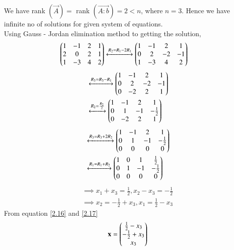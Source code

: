 \documentclass[journal,12pt,twocolumn]{IEEEtran}
\begin{document}
We have rank $\left( \vec{A} \right) = $  rank $\left( \vec{A:b}\right) = 2 < n $, where $n = 3. $ Hence we have infinite no of solutions for given system of equations.\\
Using Gauss - Jordan elimination method to getting the solution,
\begin{align}
\begin{pmatrix}1&-1& 2 & 1 \\ 2& 0 & 2 & 1 \\ 1 & -3 & 4 & 2 \end{pmatrix} &\xleftrightarrow{R_2=R_1 - 2R_1}\begin{pmatrix}1&-1&2 & 1  \\ 0 &2 & -2 & -1 \\ 1 &-3 & 4 & 2\end{pmatrix}
\end{align}
\begin{align}
&\xleftrightarrow{R_3=R_3 -R_1}\begin{pmatrix}1 &-1&2 & 1\\0 &2 &-2 &-1 \\ 0 & -2 & 2 & 1\end{pmatrix} \\
&\xleftrightarrow{R_2= \frac{R_2}{2}}\begin{pmatrix}1 &-1&2 & 1 \\ 0 & 1 & -1 & -\frac{1}{2} \\ 0 & -2 & 2 & 1\end{pmatrix} 
\end{align}
\begin{align}
&\xleftrightarrow{R_3 = R_3 +2R_2}\begin{pmatrix}1 &-1&2 & 1 \\ 0 & 1 & -1 & -\frac{1}{2} \\ 0 & 0 & 0 & 0\end{pmatrix} \\ 
&\xleftrightarrow {R_1 = R_1 + R_2}\begin{pmatrix}1 & 0 & 1 & \frac{1}{2} \\ 0 & 1 & -1 & -\frac{1}{2} \\ 0 & 0 & 0 & 0\end{pmatrix}
\end{align}
\begin{align}
\implies x_1 +x_3 = \frac{1}{2}, x_2 - x_3 = - \frac{1}{2} \label{2.16}\\
\implies x_2 = - \frac{1}{2} +x_3 , x_1 = \frac{1}{2} - x_3 \label{2.17}
\end{align}
From  equation \eqref{2.16} and \eqref{2.17}
\begin{align}
\mathbf{x} = \begin{pmatrix}\frac{1}{2} - x_3 \\ -\frac{1}{2} + x_3 \\ x_3 \end{pmatrix}
\end{align}
\end{document}
